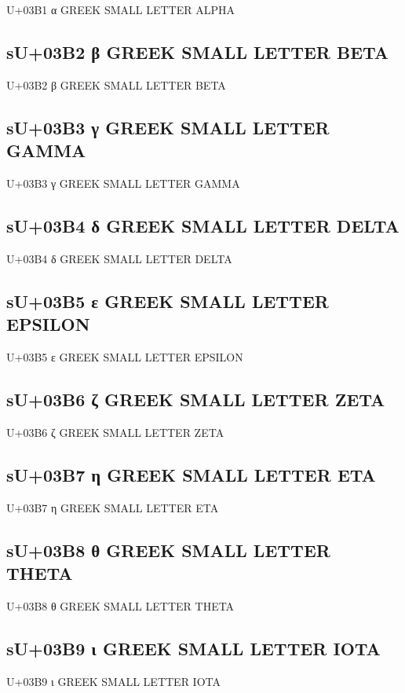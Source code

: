 U+03B1 α GREEK SMALL LETTER ALPHA

\subsection{sU+03B2 β GREEK SMALL LETTER BETA}

U+03B2 β GREEK SMALL LETTER BETA

\subsection{sU+03B3 γ GREEK SMALL LETTER GAMMA}

U+03B3 γ GREEK SMALL LETTER GAMMA

\subsection{sU+03B4 δ GREEK SMALL LETTER DELTA}

U+03B4 δ GREEK SMALL LETTER DELTA

\subsection{sU+03B5 ε GREEK SMALL LETTER EPSILON}

U+03B5 ε GREEK SMALL LETTER EPSILON

\subsection{sU+03B6 ζ GREEK SMALL LETTER ZETA}

U+03B6 ζ GREEK SMALL LETTER ZETA

\subsection{sU+03B7 η GREEK SMALL LETTER ETA}

U+03B7 η GREEK SMALL LETTER ETA

\subsection{sU+03B8 θ GREEK SMALL LETTER THETA}

U+03B8 θ GREEK SMALL LETTER THETA

\subsection{sU+03B9 ι GREEK SMALL LETTER IOTA}

U+03B9 ι GREEK SMALL LETTER IOTA

